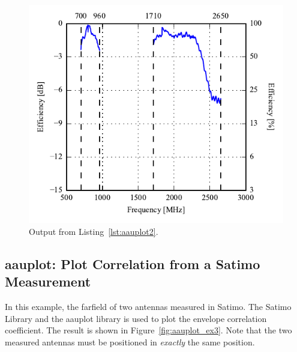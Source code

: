 

\begin{figure}[htbp]
    \centering
    \includegraphics{sec/post_processing/examples_aauplot/ex2_efficiency}
    \caption{Output from Listing~\ref{lst:aauplot2}.}
    \label{fig:aauplot_ex2}
\end{figure}

\subsection{aauplot: Plot Correlation from a Satimo Measurement}
In this example, the farfield of two antennas measured in Satimo. The Satimo Library and the aauplot library is used to plot the envelope correlation coefficient. The result is shown in Figure~\ref{fig:aauplot_ex3}. Note that the two measured antennas must be positioned in \emph{exactly} the same position.



